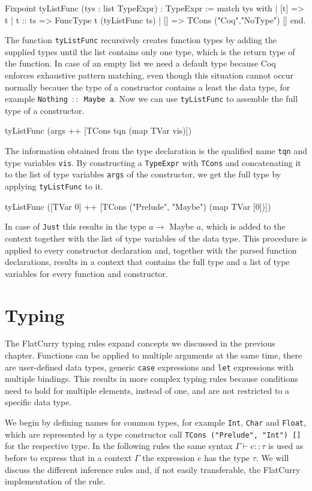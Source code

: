 \documentclass[paper = a4, fleqn, abstract=on, twoside]{scrreprt}
\newcommand{\coqinline}[1]{\texttt{#1}}
\begin{document}
\begin{coqcode}
Fixpoint tyListFunc (tys : list TypeExpr) : TypeExpr :=
  match tys with
  | [t]     => t
  | t :: ts => FuncType t (tyListFunc ts)
  | []      => TCons ("Coq","NoType") []
  end.
\end{coqcode}
The function \coqinline{tyListFunc} recursively creates function types by adding the supplied types until the list contains only one type, which is the return type of the function. In case of an empty list we need a default type because Coq enforces exhaustive pattern matching, even though this situation cannot occur normally because the type of a constructor contains a least the data type, for example \texttt{Nothing $::$ Maybe a}. Now we can use \coqinline{tyListFunc} to assemble the full type of a constructor.
\begin{coqcode}
tyListFunc (args ++ [TCons tqn (map TVar vis)])
\end{coqcode}
The information obtained from the type declaration is the qualified name \texttt{tqn} and type variables \texttt{vis}. By constructing a \coqinline{TypeExpr} with \coqinline{TCons} and concatenating it to the list of type variables \texttt{args} of the constructor, we get the full type by applying \coqinline{tyListFunc} to it.
\begin{coqcode}
tyListFunc ([TVar 0] ++ [TCons ("Prelude", "Maybe") (map TVar [0])])
\end{coqcode} 
In case of \texttt{Just} this results in the type $a \rightarrow$ Maybe $a$, which is added to the context together with the list of type variables of the data type. This procedure is applied to every constructor declaration and, together with the parsed function declarations, results in a context that contains the full type and a list of type variables for every function and constructor.
\section{Typing}
The FlatCurry typing rules expand concepts we discussed in the previous chapter. Functions can be applied to multiple arguments at the same time, there are user-defined data types, generic \texttt{case} expressions and \texttt{let} expressions with multiple bindings. This results in more complex typing rules because conditions need to hold for multiple elements, instead of one, and are not restricted to a specific data type.
\par 
We begin by defining names for common types, for example \texttt{Int}, \texttt{Char} and \texttt{Float}, which are represented by a type constructor call \texttt{TCons ("Prelude", "Int") []} for the respective type.
In the following rules the same syntax $\Gamma \vdash e :: \tau$ is used as before to express that in a context $\Gamma$ the expression $e$ has the type $\tau$. We will discuss the different inference rules and, if not easily transferable, the FlatCurry implementation of the rule.
\end{document}
